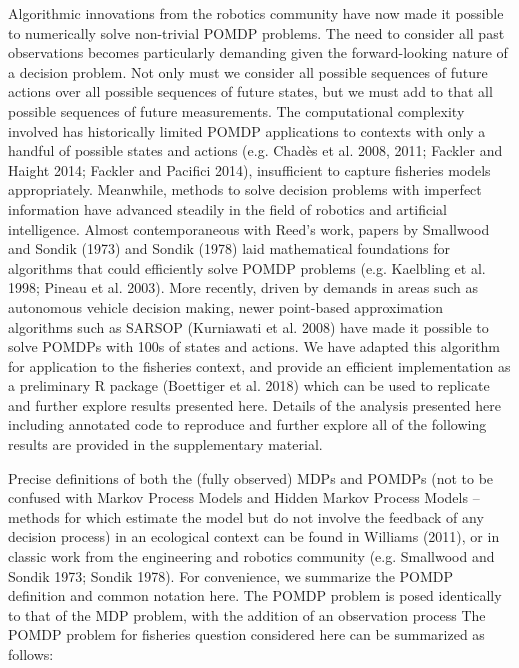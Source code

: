 \documentclass[3p]{elsarticle} %
\begin{document}
Algorithmic innovations from the robotics community have now made it
possible to numerically solve non-trivial POMDP problems. The need to
consider all past observations becomes particularly demanding given the
forward-looking nature of a decision problem. Not only must we consider
all possible sequences of future actions over all possible sequences of
future states, but we must add to that all possible sequences of future
measurements. The computational complexity involved has historically
limited POMDP applications to contexts with only a handful of possible
states and actions (e.g. Chadès et al. 2008, 2011; Fackler and Haight
2014; Fackler and Pacifici 2014), insufficient to capture fisheries
models appropriately. Meanwhile, methods to solve decision problems with
imperfect information have advanced steadily in the field of robotics
and artificial intelligence. Almost contemporaneous with Reed's work,
papers by Smallwood and Sondik (1973) and Sondik (1978) laid
mathematical foundations for algorithms that could efficiently solve
POMDP problems (e.g. Kaelbling et al. 1998; Pineau et al. 2003). More
recently, driven by demands in areas such as autonomous vehicle decision
making, newer point-based approximation algorithms such as SARSOP
(Kurniawati et al. 2008) have made it possible to solve POMDPs with 100s
of states and actions. We have adapted this algorithm for application to
the fisheries context, and provide an efficient implementation as a
preliminary R package (Boettiger et al. 2018) which can be used to
replicate and further explore results presented here. Details of the
analysis presented here including annotated code to reproduce and
further explore all of the following results are provided in the
supplementary material.

Precise definitions of both the (fully observed) MDPs and POMDPs (not to
be confused with Markov Process Models and Hidden Markov Process Models
-- methods for which estimate the model but do not involve the feedback
of any decision process) in an ecological context can be found in
Williams (2011), or in classic work from the engineering and robotics
community (e.g. Smallwood and Sondik 1973; Sondik 1978). For
convenience, we summarize the POMDP definition and common notation here.
The POMDP problem is posed identically to that of the MDP problem, with
the addition of an observation process The POMDP problem for fisheries
question considered here can be summarized as follows:
\end{document}
